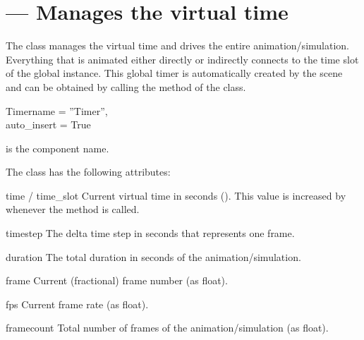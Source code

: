 
\section{ ---
         Manages the virtual time}
\label{timer}

The  class manages the virtual time and drives the entire
animation/simulation. Everything that is animated either directly or
indirectly connects to the time slot of the global  instance.
This global timer is automatically created by the scene and can be
obtained by calling the  method of the  class.


\begin{classdesc}{Timer}{name = ''Timer'',\\ 
                         auto_insert = True}


 is the component name.
\end{classdesc}


The  class has the following attributes:

\begin{datadesc}{time / time_slot}
Current virtual time in seconds ().
This value is increased by  whenever the  
method is called.
\end{datadesc}

\begin{datadesc}{timestep}
The delta time step in seconds that represents one frame.
\end{datadesc}

\begin{datadesc}{duration}
The total duration in seconds of the animation/simulation.
\end{datadesc}

\begin{datadesc}{frame}
Current (fractional) frame number (as float).
\end{datadesc}

\begin{datadesc}{fps}
Current frame rate (as float).
\end{datadesc}

\begin{datadesc}{framecount}
Total number of frames of the animation/simulation (as float).
\end{datadesc}

